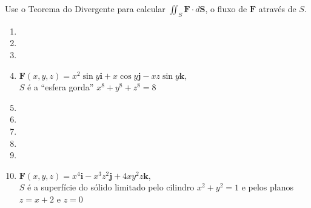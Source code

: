 



	
	
	\vspace{5mm}
	
	Use o Teorema do Divergente para calcular $\displaystyle \iint_S \textbf{F} \cdot d\textbf{S}$, o fluxo de $\textbf{F}$ através de $S$.
	
	\begin{enumerate}
		
		\item
		\resposta{}

		\item
		\resposta{}

		\item
		\resposta{}

		\item $\textbf{F}(x,y,z) = x^{2}\sin y\textbf{i} + x\cos y\textbf{j} - xz\sin y\textbf{k}$, \\ $S$ é a ``esfera gorda'' $x^8 + y^8 + z^8 = 8$
		\resposta{\fazer}

		\item
		\resposta{}

		\item
		\resposta{}

		\item
		\resposta{}

		\item
		\resposta{}

		\item
		\resposta{}

		\item $\textbf{F}(x,y,z) = x^{4}\textbf{i} - x^{3}z^{2}\textbf{j} + 4xy^{2}z\textbf{k}$, \\ $S$ é a superfície do sólido limitado pelo cilindro $x^2 + y^2 = 1$ e pelos planos $z = x + 2$ e $z = 0$
		\resposta{\fazer}
	
	\end{enumerate}
		
	\vspace{5mm}	
	
	


